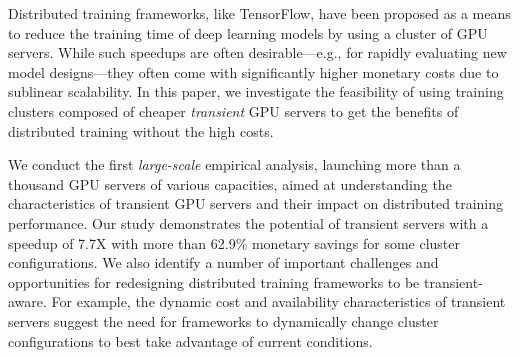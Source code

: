 

Distributed training frameworks, like TensorFlow, have been proposed as a means
to reduce the training time of deep learning models by using a cluster of GPU
servers. While such speedups are  often desirable---e.g., for rapidly
evaluating new model designs---they often come with significantly higher
monetary costs due to sublinear scalability. In this paper, we investigate the
feasibility of using training clusters  composed of cheaper  \emph{transient}
GPU servers to get the benefits of distributed training without the high costs.

We conduct the first \emph{large-scale} empirical analysis, launching more than
a thousand GPU servers of various capacities, aimed at understanding the
characteristics of transient GPU servers and their impact on distributed
training performance. Our study demonstrates the potential of  transient
servers with a speedup of 7.7X with more than 62.9\% monetary savings for some
cluster configurations. We also identify a number of important challenges and
opportunities for redesigning distributed training frameworks to be
transient-aware. For example, the dynamic cost and availability characteristics
of transient servers suggest the need for frameworks to dynamically change
cluster configurations to best take advantage of current conditions. 
 
